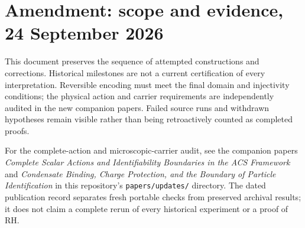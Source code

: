 \documentclass[11pt,a4paper]{article}
\theoremstyle{definition}
\theoremstyle{plain}
\begin{document}
\section*{Amendment: scope and evidence, 24 September 2026}
This document preserves the sequence of attempted constructions and corrections. Historical milestones are not a current certification of every interpretation. Reversible encoding must meet the final domain and injectivity conditions; the physical action and carrier requirements are independently audited in the new companion papers. Failed source runs and withdrawn hypotheses remain visible rather than being retroactively counted as completed proofs.

For the complete-action and microscopic-carrier audit, see the companion
papers \emph{Complete Scalar Actions and Identifiability Boundaries in the ACS
Framework} and \emph{Condensate Binding, Charge Protection, and the Boundary
of Particle Identification} in this repository's \texttt{papers/updates/}
directory. The dated publication record separates fresh portable checks
from preserved archival results; it does not claim a complete rerun of every
historical experiment or a proof of RH.
\end{document}
